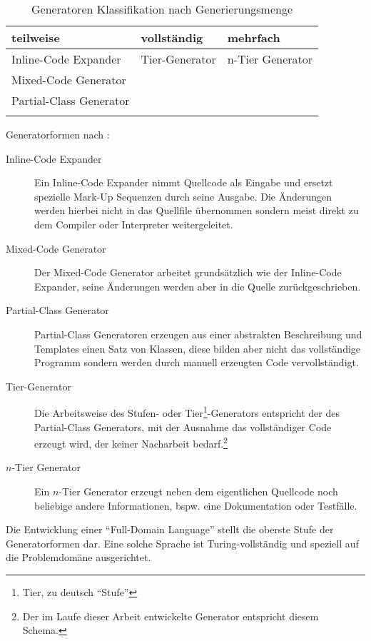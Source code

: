 \begin{table}[htb]
    \begin{longtable}[c]{l l l}
        \toprule
        \rowcolor{lightgray}
        \textbf{teilweise}   & \textbf{vollständig}     & \textbf{mehrfach}\\
        \midrule
        Inline-Code Expander    & Tier-Generator    & n-Tier Generator\\
        Mixed-Code Generator & &\\
        Partial-Class Generator & & \\
        \bottomrule
        \caption{Generatoren Klassifikation nach Generierungsmenge}
        \label{tab:generatorclassification}
    \end{longtable} 
\end{table}

Generatorformen nach \cite{herrington2003code}:
\begin{description}
    \item[Inline-Code Expander]
        Ein Inline-Code Expander nimmt Quellcode als Eingabe und ersetzt spezielle Mark-Up Sequenzen durch seine Ausgabe. Die Änderungen werden hierbei nicht in das Quellfile übernommen sondern meist direkt zu dem Compiler oder Interpreter weitergeleitet.
    \item[Mixed-Code Generator]
        Der Mixed-Code Generator arbeitet grundsätzlich wie der Inline-Code Expander, seine Änderungen werden aber in die Quelle zurückgeschrieben.
    \item[Partial-Class Generator]
        Partial-Class Generatoren erzeugen aus einer abstrakten Beschreibung und Templates einen Satz von Klassen, diese bilden aber nicht das vollständige Programm sondern werden durch manuell erzeugten Code vervollständigt. %
    \item[Tier-Generator]
        Die Arbeitsweise des Stufen- oder Tier\footnote{Tier, zu deutsch \enquote{Stufe}}-Generators entspricht der des Partial-Class Generators, mit der Ausnahme das vollständiger Code erzeugt wird, der keiner Nacharbeit bedarf.\footnote{Der im Laufe dieser Arbeit entwickelte Generator entspricht diesem Schema.}
    \item[$n$-Tier Generator] 
        Ein $n$-Tier Generator erzeugt neben dem eigentlichen Quellcode noch beliebige andere Informationen, bspw. eine Dokumentation oder Testfälle.
\end{description}

Die Entwicklung einer \enquote{Full-Domain Language} stellt die oberste Stufe der Generatorformen dar. Eine solche Sprache ist Turing-vollständig und speziell auf die Problemdomäne ausgerichtet.

